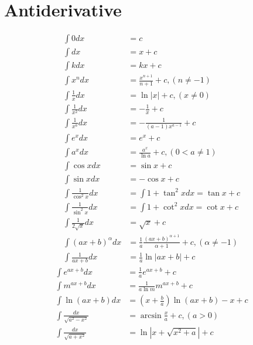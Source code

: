 \documentclass[a4paper, 11pt]{book}
\begin{document}
    \chapter{Antiderivative}

    \begin{multicols}{2}
        \begin{align}
            \int{0}dx &= c\\
            \int{}dx &= x+c\\
            \int{k}dx &= kx+c\\
            \int{x^{n}}dx &= \frac{x^{n+1}}{n+1}+c, (n\neq-1)\\
            \int{\frac{1}{x}}dx &= \ln{|x|}+c, (x\neq0)\\
            \int{\frac{1}{x^{2}}}dx &= -\frac{1}{x}+c\\
            \int{\frac{1}{x^{a}}}dx &= -\frac{1}{(a-1)x^{a-1}}+c\\
            \int{e^{x}}dx &= e^{x} + c\\
            \int{a^{x}}dx &= \frac{a^{x}}{\ln{a}}+c, (0<a\neq1)\\
            \int{\cos{x}}dx &= \sin{x}+c\\
            \int{\sin{x}}dx &= -\cos{x}+c\\
            \int{\frac{1}{\cos^{2}x}}dx &= \int{1+\tan^{2}x}dx = \tan{x}+c\\
            \int{\frac{1}{\sin^{2}x}}dx &= \int{1+\cot^{2}x}dx = \cot{x}+c\\
            \int{\frac{1}{2\sqrt{x}}}dx &= \sqrt{x}+c\\
            \int{(ax+b)^{\alpha}}dx &= \frac{1}{a}\frac{(ax+b)^{\alpha+1}}{\alpha+1}+c, (\alpha\neq-1)\\
            \int{\frac{1}{ax+b}}dx &= \frac{1}{a}\ln{|ax+b|}+c
        \end{align}
        \columnbreak
        \begin{align}
            \int{e^{ax+b}}dx &= \frac{1}{a}e^{ax+b}+c\\
            \int{m^{ax+b}}dx &= \frac{1}{a\ln{m}}m^{ax+b}+c\\
            \int{\ln{(ax+b)}}dx &= \left(x+\frac{b}{a}\right)\ln{(ax+b)}-x+c\\
            \int{\frac{dx}{\sqrt{a^{2}-x^{2}}}} &= \arcsin{\frac{x}{a}}+c, (a>0)\\
            \int{\frac{dx}{\sqrt{a+x^{2}}}} &= \ln{|x+\sqrt{x^{2}+a}|}+c\\

\end{align}
\end{multicols}
\end{document}
